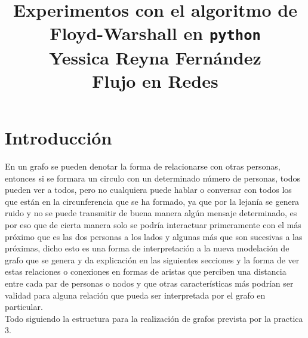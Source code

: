 \documentclass[12pt]{article}
\begin{document}
\title{{\LARGE \textbf{Experimentos con el algoritmo de Floyd-Warshall en \texttt{python}}}\\ {\large Yessica Reyna Fernández}\\{\large Flujo en Redes}}
\maketitle
\section{Introducción}
En un grafo se pueden denotar la forma de relacionarse con otras personas, entonces si se formara un circulo con un determinado número de personas, todos pueden ver a todos, pero no cualquiera puede hablar o conversar con todos los que están en la circunferencia que se ha formado, ya que por la lejanía se genera ruido y no se puede transmitir de buena manera algún mensaje determinado, es por eso que de cierta manera solo se podría interactuar primeramente con el más próximo que es las dos personas a los lados y algunas más que son sucesivas a las próximas, dicho esto es una forma de interpretación a la nueva modelación de grafo que se genera y da explicación en las siguientes secciones y la forma de ver estas relaciones o conexiones en formas de aristas que perciben una distancia entre cada par de personas o nodos y que otras características más podrían ser validad para alguna relación que pueda ser interpretada por el grafo en particular.\\Todo siguiendo la estructura para la realización de grafos prevista por la practica 3\cite{mio}.
\end{document}
